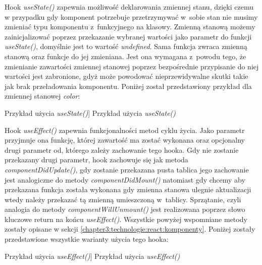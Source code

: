 \documentclass[../Kamil_Kowalewski_Main.tex]{subfiles}
\begin{document}
{{{            Hook \textit{useState()} zapewnia możliwość deklarowania zmiennej stanu,
            dzięki czemu w przypadku gdy komponent potrzebuje przetrzymywać w~sobie
            stan nie musimy zmieniać typu komponentu z~funkcyjnego na klasowy. Zmienną
            stanową możemy zainicjalizować poprzez przekazanie wybranej wartości jako
            parametr do funkcji \textit{useState()}, domyślnie jest to wartość
            \textit{undefined}. Sama funkcja zwraca zmienną stanową oraz funkcje do jej
            zmieniana. Jest ona wymagana z~powodu tego, że zmienianie zawartości
            zmiennej stanowej poprzez bezpośrednie przypisanie do niej wartości jest
            zabronione, gdyż może powodować nieprzewidywalne skutki takie jak brak
            przeładowania komponentu. Poniżej został przedstawiony przykład dla
            zmiennej stanowej \textit{color}:
            \begin{code}[H]
                
                \caption
                [Przykład użycia \textit{useState()}]
                {Przykład użycia \textit{useState()}}
                \label{chapter3:technologie:react:hooks:usestate}
            \end{code}

            Hook \textit{useEffect()} zapewnia funkcjonalności metod cyklu życia. Jako
            parametr przyjmuje ona funkcję, której zawartość ma zostać wykonana oraz
            opcjonalny drugi parametr od, którego zależy zachowanie tego hooka. Gdy nie
            zostanie przekazany drugi parametr, hook zachowuje się jak metoda
            \textit{componentDidUpdate()}, gdy zostanie przekazana pusta tablica jego
            zachowanie jest analogiczne do metody \textit{componentDidMount()}
            natomiast gdy chcemy aby przekazana funkcja została wykonana gdy zmienna
            stanowa ulegnie aktualizacji wtedy należy przekazać tą zmienną umieszczoną
            w~tablicy. Sprzątanie, czyli analogia do metody \textit{componentWillUnmount()}
            jest realizowana poprzez słowo kluczowe return na końcu \textit{useEffect()}.
            Wszystkie powyżej wspomniane metody zostały opisane w sekcji
            \ref{chapter3:technologie:react:komponenty}. Poniżej zostały przedstawione
            wszystkie warianty użycia tego hooka:
            \begin{code}[H]
                
                \caption
                [Przykład użycia \textit{useEffect()}]
                {Przykład użycia \textit{useEffect()}}
                \label{chapter3:technologie:react:hooks:useeffect}
            \end{code}

}}}
\end{document}
